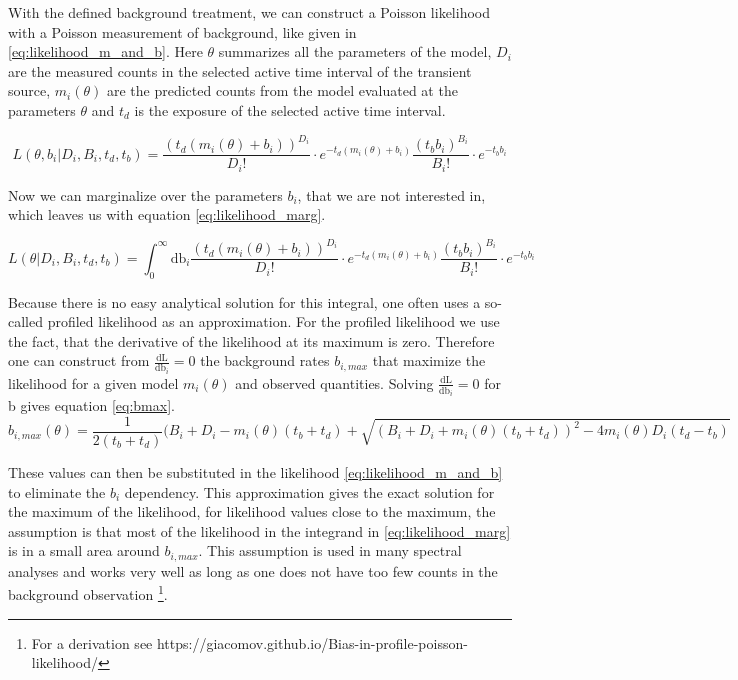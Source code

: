 \documentclass[twocolumn]{aa}
\begin{document}
With the defined background treatment, we can construct a Poisson likelihood with a Poisson measurement of background, like given in \ref{eq:likelihood_m_and_b}. Here $\theta$ summarizes all the parameters of the model, $D_{i}$ are the measured counts in the selected active time interval of the transient source, $m_{i}(\theta)$ are the predicted counts from the model evaluated at the parameters $\theta$ and $t_{d}$ is the exposure of the selected active time interval.

\begin{equation}
	L(\theta, b_{i}|D_{i}, B_{i},t_{d},t_{b}) = \frac{(t_{d}(m_{i}(\theta)+ b_{i}))^{D_{i}}}{D_{i}!}\cdot e^{-t_{d}(m_{i}(\theta)+b_{i})} \frac{(t_{b} b_{i})^{B_{i}}}{B_{i}!}\cdot e^{-t_{b} b_{i}}
  \label{eq:likelihood_m_and_b}
\end{equation}

Now we can marginalize over the parameters $b_{i}$, that we are not interested in, which leaves us with equation \ref{eq:likelihood_marg}.

\begin{equation}
	L(\theta|D_{i}, B_{i},t_{d},t_{b}) = \int_{0}^{\infty}\textrm{db}_{i}\frac{(t_{d}(m_{i}(\theta)+ b_{i}))^{D_{i}}}{D_{i}!}\cdot e^{-t_{d}(m_{i}(\theta)+b_{i})} \frac{(t_{b} b_{i})^{B_{i}}}{B_{i}!}\cdot e^{-t_{b}b_{i}}
  \label{eq:likelihood_marg}
\end{equation}

Because there is no easy analytical solution for this integral, one often uses a so-called profiled likelihood as an approximation. For the profiled likelihood we use the fact, that the derivative of the likelihood at its maximum is zero. Therefore one can construct from $\frac{\textrm{dL}}{\textrm{db}_i}=0$ the background rates $b_{i, max}$ that maximize the likelihood for a given model $m_{i}(\theta)$ and observed quantities. Solving $\frac{\textrm{dL}}{\textrm{db}_i}=0$ for b gives equation \ref{eq:bmax}.
\begin{equation}
	b_{i,max}(\theta)=\frac{1}{2(t_{b}+t_{d})}(B_{i}+D_{i}-m_{i}(\theta)(t_{b}+t_{d})+\sqrt{(B_{i}+D_{i}+m_{i}(\theta)(t_{b}+t_{d}))^{2}-4m_{i}(\theta)D_{i}(t_{d}-t_{b})}
  \label{eq:bmax}
\end{equation}

These values can then be substituted in the likelihood \ref{eq:likelihood_m_and_b} to eliminate the $b_{i}$ dependency. This approximation gives the exact solution for the maximum of the likelihood, for likelihood values close to the maximum, the assumption is that most of the likelihood in the integrand in \ref{eq:likelihood_marg} is in a small area around $b_{i,max}$. This assumption is used in many spectral analyses and works very well as long as one does not have too few counts in the background observation \footnote{For a derivation see https://giacomov.github.io/Bias-in-profile-poisson-likelihood/}.
\end{document}
